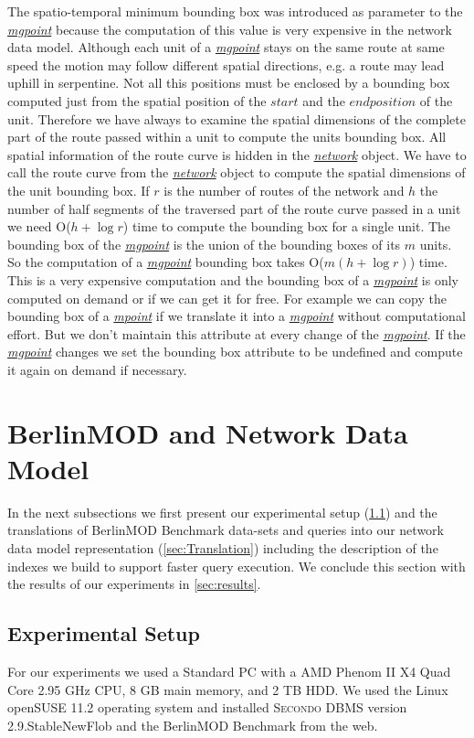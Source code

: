 \documentclass[a4paper]{article}
\newcommand{\secondo}{\textsc{Secondo}}
\newcommand{\bmodb} {BerlinMOD Benchmark}
\newcommand{\dt}[1]{\textsl{\underline{#1}}}
\newcommand{\secver}{2.9.StableNewFlob}
\begin{document}
{The spatio-temporal minimum bounding box was introduced as parameter to the
\dt{mgpoint} because the computation of this value is very expensive in the
network data model. Although each unit of a \dt{mgpoint} stays on the same route
at same speed the motion may follow different spatial directions, e.g. a route may
lead uphill in serpentine. Not all this positions must be enclosed by a bounding box
computed just from the spatial position of the $start$ and the $end position$
of the unit. Therefore we have always to examine the spatial dimensions of the
complete part of the route passed within a unit to compute the units bounding box.
All spatial information of the route curve is hidden in the \dt{network} object.
We have to call the route curve from the \dt{network} object to compute the
spatial dimensions of the unit bounding box. If $r$ is the number of routes
of the network and $h$ the number of half segments of the traversed part of
the route curve passed in a unit we need O($h + \log r$) time to
compute the bounding box for a single unit. The bounding box of the \dt{mgpoint}
is the union of the bounding boxes of its $m$ units. So the computation of
a \dt{mgpoint} bounding box takes O($m(h + \log r)$) time. This is a
very expensive computation and the bounding box of a \dt{mgpoint} is only computed
on  demand or if we can get it for free. For example we can copy the bounding box
of a \dt{mpoint} if we translate it into a \dt{mgpoint} without computational effort.
But we don't maintain this attribute at every change of the \dt{mgpoint}. If the
\dt{mgpoint} changes we set the bounding box attribute to be undefined and compute
it again on demand if necessary.
\section{BerlinMOD and Network Data Model}
\label{sec:bmodbNetDataMod}
In the next subsections we first present our experimental setup (\ref{sec:scenario})
and the translations of \bmodb{} data-sets and queries into our network data model  representation (\ref{sec:Translation}) including the description of the indexes
we build to support faster query execution. We conclude this section with the
results of our experiments in \ref{sec:results}.
\subsection{Experimental Setup}
\label{sec:scenario}
For our experiments we used a Standard PC with a AMD Phenom II X4 Quad Core 2.95 GHz CPU,
8 GB main memory, and 2 TB HDD. We used the Linux openSUSE 11.2 operating system and
installed \secondo{} DBMS version \secver{} and the \bmodb{} from the web.

}
\end{document}
